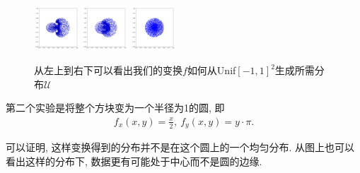 \documentclass[lang=cn,11pt]{elegantpaper}
\begin{document}
\begin{figure}[btbp]
  \includegraphics[width=0.15\textwidth]{circle_1_81}
  \includegraphics[width=0.15\textwidth]{circle_1_9}
  \includegraphics[width=0.15\textwidth]{circle_1_10}
  \caption{从左上到右下可以看出我们的变换$f$如何从Unif$[-1,1]^2$生成所需分布$\mathcal U$}
\end{figure}

第二个实验是将整个方块变为一个半径为1的圆, 即
\begin{align*}
	f_x(x,y)=\frac{x}{2},\ f_y(x,y)=y\cdot\pi.
\end{align*}

可以证明, 这样变换得到的分布并不是在这个圆上的一个均匀分布. 从图上也可以看出这样的分布下, 数据更有可能处于中心而不是圆的边缘.
\end{document}
